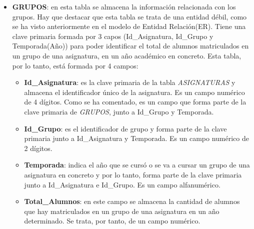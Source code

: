 \begin{itemize}
\item
\textbf{GRUPOS}: en esta tabla se almacena la información relacionada con los grupos. Hay que destacar que esta tabla se trata de una entidad débil, como se ha visto anteriormente en el modelo de Entidad Relación(ER). Tiene una clave primaria formada por 3 capos (Id\_Asignatura, Id\_Grupo y Temporada(Año)) para poder identificar el total de alumnos matriculados en un grupo de una asignatura, en un año académico en concreto. Esta tabla, por lo tanto, está formada por 4 campos:
\begin{itemize}
\item
\textbf{Id\_Asignatura}: es la clave primaria de la tabla \emph{ASIGNATURAS} y almacena el identificador único de la asignatura. Es un campo numérico de 4 dígitos. Como se ha comentado, es un campo que forma parte de la clave primaria de \emph{GRUPOS}, junto a  Id\_Grupo y Temporada.
\item
\textbf{Id\_Grupo}: es el identificador de grupo y forma parte de la clave primaria junto a  Id\_Asignatura y Temporada. Es un campo numérico de 2 dígitos.
\item
\textbf{Temporada}: indica el año que se cursó o se va a cursar un grupo de una asignatura en concreto y por lo tanto, forma parte de la clave primaria junto a  Id\_Asignatura e Id\_Grupo. Es un campo alfanumérico.
\item
\textbf{Total\_Alumnos}: en este campo se almacena la cantidad de alumnos que hay matriculados en un grupo de una asignatura en un año determinado. Se trata, por tanto, de un campo numérico.
\end{itemize}


\newpage



\end{itemize}
